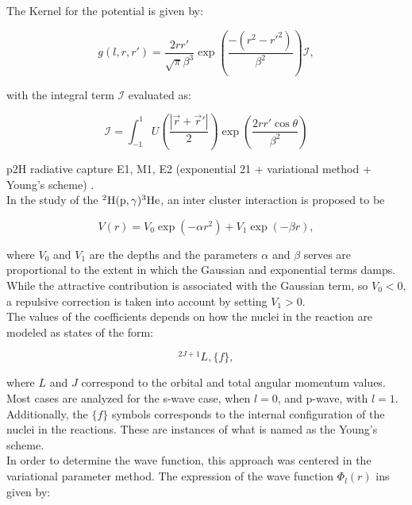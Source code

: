 \documentclass[openany]{book}
\begin{document}
The Kernel for the potential is given by: 

\begin{equation}\label{potential_nonLocal_Mumbai_kernel}
	g(l, r, r') = \frac{2rr'}{\sqrt{\pi}\beta^3} \exp {\left(\frac{-(r^2 - r'^2)}{\beta^2}\right)} \mathcal{I},
\end{equation}

with the integral term $\mathcal{I}$ evaluated as: 

\begin{equation}\label{potential_nonLocal_Mumbai_kernel_integral}
	\mathcal{I} = \int_{-1}^{1}{U \left(\frac{|\vec r + \vec r'|}{2} \right) \exp \left(\frac{2rr'\cos \theta}{\beta^2}\right)}
\end{equation}

p2H radiative capture E1, M1, E2 (exponential 21 + variational method + Young's scheme) \cite{dubovichenko_dzhazairov-kakhramanov_2009}. \\

In the study of the $\mathrm{{}^{2}H(p, \gamma){}^{3}He}$, an inter cluster interaction is proposed to be 


\begin{equation}\label{eq:potential_intercluster_12}
		V(r) = V_0 \exp (-\alpha r^2) + V_1 \exp (-\beta r),
\end{equation}

where $V_0$ and $V_1$ are the depths and the parameters $\alpha$ and $\beta$ serves are proportional to the extent in which the Gaussian and exponential terms damps. While the attractive contribution is associated with the Gaussian term, so $V_0 < 0$, a repulsive correction is taken into account by setting  $V_1 > 0$. \\

The values of the coefficients depends on how the nuclei in the reaction are modeled as states of the form: 

\begin{equation}\label{eq:potential_Young_scheme}
	{}^{2J + 1} L, \{f\},
\end{equation}

where $L$ and $J$ correspond to the orbital and total angular momentum values. Most cases are analyzed for the s-wave case, when $l = 0$, and p-wave, with $l = 1$. Additionally, the $\{f\}$ symbols corresponds to the internal configuration of the nuclei in the reactions. These are instances of what is named as the Young's scheme.\\

In order to determine the wave function, this approach was centered in the variational parameter method. The expression of the wave function $\Phi_l(r)$ ins given by:
\end{document}
